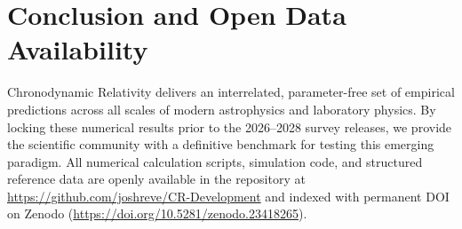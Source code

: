\documentclass[aps,prd,reprint,superscriptaddress,nofootinbib,twocolumn,floatfix]{revtex4-2}
\begin{document}
\section{Conclusion and Open Data Availability}
\label{sec:conclusion}

Chronodynamic Relativity delivers an interrelated, parameter-free set of empirical predictions across all scales of modern astrophysics and laboratory physics. By locking these numerical results prior to the 2026--2028 survey releases, we provide the scientific community with a definitive benchmark for testing this emerging paradigm. All numerical calculation scripts, simulation code, and structured reference data are openly available in the repository at \url{https://github.com/joshreve/CR-Development} and indexed with permanent DOI on Zenodo (\url{https://doi.org/10.5281/zenodo.23418265}).


\end{document}
